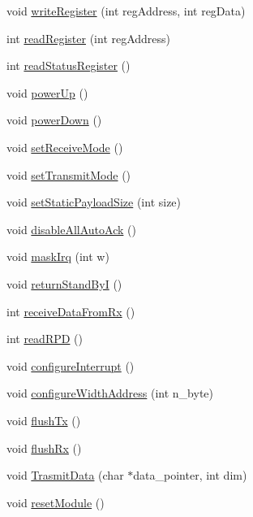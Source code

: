 \begin{DoxyCompactItemize}
\item 
void \hyperlink{classNRF24L01P_ade50e41c80bb031a294817918f136c9f}{write\-Register} (int reg\-Address, int reg\-Data)
\item 
int \hyperlink{classNRF24L01P_afd284d41d89001711b70e91cee81527f}{read\-Register} (int reg\-Address)
\item 
int \hyperlink{classNRF24L01P_a95fbce4202f87a395227eaeaa5f413dc}{read\-Status\-Register} ()
\item 
void \hyperlink{classNRF24L01P_abb14117708cbb33c030b10b998aee257}{power\-Up} ()
\item 
void \hyperlink{classNRF24L01P_a08417ea2c94af0cb888047c6390b2cdc}{power\-Down} ()
\item 
void \hyperlink{classNRF24L01P_adde3da438309f8fc6ba905b0a26fbba0}{set\-Receive\-Mode} ()
\item 
void \hyperlink{classNRF24L01P_a194b50ca9c3c12c2662a8885fb1a15b9}{set\-Transmit\-Mode} ()
\item 
void \hyperlink{classNRF24L01P_aad66421b7e51793d7cd0af45de55ee67}{set\-Static\-Payload\-Size} (int size)
\item 
void \hyperlink{classNRF24L01P_ab5375b44c078e54e5b0ffaf0e4ef1007}{disable\-All\-Auto\-Ack} ()
\item 
void \hyperlink{classNRF24L01P_aa1b0b5ef35510be2c4587ca900f65c6a}{mask\-Irq} (int w)
\item 
void \hyperlink{classNRF24L01P_a07121aaf4fad55c54d945113491f18d2}{return\-Stand\-By\-I} ()
\item 
int \hyperlink{classNRF24L01P_a984025131de281d6252d1b3e18bac616}{receive\-Data\-From\-Rx} ()
\item 
int \hyperlink{classNRF24L01P_a1c5c063454693dc6be5c44eab73923ae}{read\-R\-P\-D} ()
\item 
void \hyperlink{classNRF24L01P_a9dd2ddd8c8b279818ced54ec7fb091cf}{configure\-Interrupt} ()
\item 
void \hyperlink{classNRF24L01P_ab2b3acff178965011b16c89b6ab625e3}{configure\-Width\-Address} (int n\-\_\-byte)
\item 
void \hyperlink{classNRF24L01P_a7f54b573bd9f00241ef1c241b289f330}{flush\-Tx} ()
\item 
void \hyperlink{classNRF24L01P_a1ba68a46a24e5d8e132d35e45ba16082}{flush\-Rx} ()
\item 
void \hyperlink{classNRF24L01P_acbabd86fc54ccfd565ccf0d1b4f1d754}{Trasmit\-Data} (char $\ast$data\-\_\-pointer, int dim)
\item 
void \hyperlink{classNRF24L01P_a87120ecdd3d3ddfc6935589692bc240b}{reset\-Module} ()

\end{DoxyCompactItemize}
